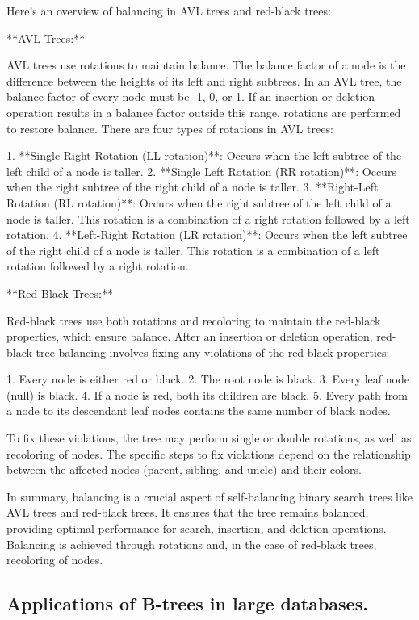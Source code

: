 \documentclass{article}
\begin{document}
Here's an overview of balancing in AVL trees and red-black trees:

**AVL Trees:**

AVL trees use rotations to maintain balance. The balance factor of a node is the difference between the heights of its left and right subtrees. In an AVL tree, the balance factor of every node must be -1, 0, or 1. If an insertion or deletion operation results in a balance factor outside this range, rotations are performed to restore balance. There are four types of rotations in AVL trees:

1. **Single Right Rotation (LL rotation)**: Occurs when the left subtree of the left child of a node is taller.
2. **Single Left Rotation (RR rotation)**: Occurs when the right subtree of the right child of a node is taller.
3. **Right-Left Rotation (RL rotation)**: Occurs when the right subtree of the left child of a node is taller. This rotation is a combination of a right rotation followed by a left rotation.
4. **Left-Right Rotation (LR rotation)**: Occurs when the left subtree of the right child of a node is taller. This rotation is a combination of a left rotation followed by a right rotation.

**Red-Black Trees:**

Red-black trees use both rotations and recoloring to maintain the red-black properties, which ensure balance. After an insertion or deletion operation, red-black tree balancing involves fixing any violations of the red-black properties:

1. Every node is either red or black.
2. The root node is black.
3. Every leaf node (null) is black.
4. If a node is red, both its children are black.
5. Every path from a node to its descendant leaf nodes contains the same number of black nodes.

To fix these violations, the tree may perform single or double rotations, as well as recoloring of nodes. The specific steps to fix violations depend on the relationship between the affected nodes (parent, sibling, and uncle) and their colors.

In summary, balancing is a crucial aspect of self-balancing binary search trees like AVL trees and red-black trees. It ensures that the tree remains balanced, providing optimal performance for search, insertion, and deletion operations. Balancing is achieved through rotations and, in the case of red-black trees, recoloring of nodes.


\subsection{Applications of B-trees in large databases.}
\end{document}
